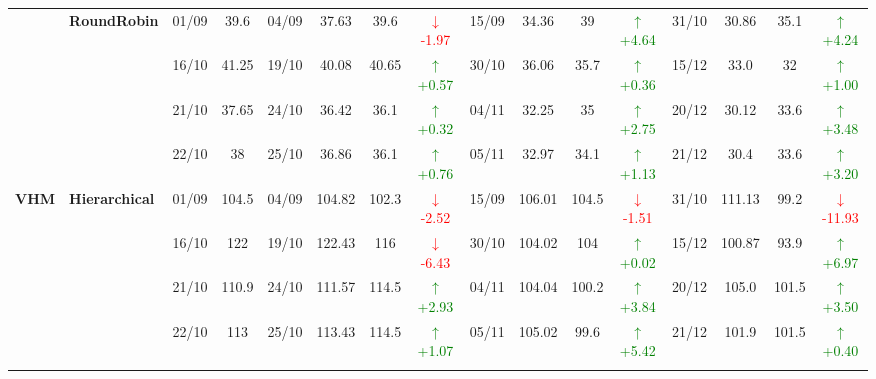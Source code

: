 {\begin{longtable}{llcc|cccc|cccc|cccc}
& \textbf{RoundRobin}
& 01/09 & 39.6 & 04/09 & 37.63 & 39.6 & \textcolor{red}{\(\downarrow\)-1.97} & 15/09 & 34.36 & 39 & \textcolor{green}{\(\uparrow\)+4.64} & 31/10 & 30.86 & 35.1 & \textcolor{green}{\(\uparrow\)+4.24} \\

&
& 16/10 & 41.25 & 19/10 & 40.08 & 40.65 & \textcolor{green}{\(\uparrow\)+0.57} & 30/10 & 36.06 & 35.7 & \textcolor{green}{\(\uparrow\)+0.36} & 15/12 & 33.0 & 32 & \textcolor{green}{\(\uparrow\)+1.00} \\

&
& 21/10 & 37.65 & 24/10 & 36.42 & 36.1 & \textcolor{green}{\(\uparrow\)+0.32} & 04/11 & 32.25 & 35 & \textcolor{green}{\(\uparrow\)+2.75} & 20/12 & 30.12 & 33.6 & \textcolor{green}{\(\uparrow\)+3.48} \\

&
& 22/10 & 38 & 25/10 & 36.86 & 36.1 & \textcolor{green}{\(\uparrow\)+0.76} & 05/11 & 32.97 & 34.1 & \textcolor{green}{\(\uparrow\)+1.13} & 21/12 & 30.4 & 33.6 & \textcolor{green}{\(\uparrow\)+3.20} \\
\midrule




\multirow{12}{*}{\textbf{VHM}} 
& \textbf{Hierarchical}
& 01/09 & 104.5 & 04/09 & 104.82 & 102.3 & \textcolor{red}{\(\downarrow\)-2.52} & 15/09 & 106.01 & 104.5 & \textcolor{red}{\(\downarrow\)-1.51} & 31/10 & 111.13 & 99.2 & \textcolor{red}{\(\downarrow\)-11.93} \\

&
& 16/10 & 122 & 19/10 & 122.43 & 116 & \textcolor{red}{\(\downarrow\)-6.43} & 30/10 & 104.02 & 104 & \textcolor{green}{\(\uparrow\)+0.02} & 15/12 & 100.87 & 93.9 & \textcolor{green}{\(\uparrow\)+6.97} \\

&
& 21/10 & 110.9 & 24/10 & 111.57 & 114.5 & \textcolor{green}{\(\uparrow\)+2.93} & 04/11 & 104.04 & 100.2 & \textcolor{green}{\(\uparrow\)+3.84} & 20/12 & 105.0 & 101.5 & \textcolor{green}{\(\uparrow\)+3.50} \\

&
& 22/10 & 113 & 25/10 & 113.43 & 114.5 & \textcolor{green}{\(\uparrow\)+1.07} & 05/11 & 105.02 & 99.6 & \textcolor{green}{\(\uparrow\)+5.42} & 21/12 & 101.9 & 101.5 & \textcolor{green}{\(\uparrow\)+0.40} \\
\cmidrule(lr){2-16}



\end{longtable}}
